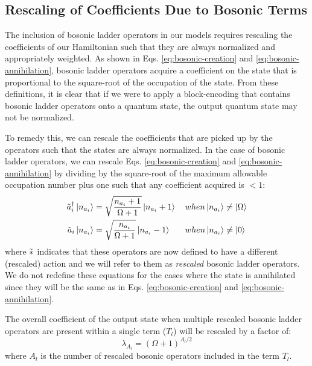 \subsection{Rescaling of Coefficients Due to Bosonic Terms}
\label{subsec:rescaling}

The inclusion of bosonic ladder operators in our models requires rescaling the coefficients of our Hamiltonian such that they are always normalized and appropriately weighted.
As shown in Eqs. \ref{eq:bosonic-creation} and \ref{eq:bosonic-annihilation}, bosonic ladder operators acquire a coefficient on the state that is proportional to the square-root of the occupation of the state.
From these definitions, it is clear that if we were to apply a block-encoding that contains bosonic ladder operators onto a quantum state, the output quantum state may not be normalized.

To remedy this, we can rescale the coefficients that are picked up by the operators such that the states are always normalized.
In the case of bosonic ladder operators, we can rescale Eqs. \ref{eq:bosonic-creation} and \ref{eq:bosonic-annihilation} by dividing by the square-root of the maximum allowable occupation number plus one such that any coefficient acquired is $< 1$:
\begin{equation}
    \label{eq:bosonic-ops-altered}
    \begin{split}
        \Tilde{a}_i^\dagger \ket{n_{a_i}} &= \sqrt{\frac{n_{a_i} + 1}{\Omega + 1}} \ket{n_{a_i} + 1} \hspace{1em} when \ket{n_{a_i}} \neq \ket{\Omega} \\
        \Tilde{a}_i  \ket{n_{a_i}} &= \sqrt{\frac{n_{a_i}}{\Omega + 1}} \ket{n_{a_i} - 1} \hspace{1.7em} when \ket{n_{a_i}} \neq \ket{0}
    \end{split}
\end{equation}
where $\Tilde{*}$ indicates that these operators are now defined to have a different (rescaled) action and we will refer to them as \textit{rescaled} bosonic ladder operators.
We do not redefine these equations for the cases where the state is annihilated since they will be the same as in Eqs.  \ref{eq:bosonic-creation} and \ref{eq:bosonic-annihilation}.

The overall coefficient of the output state when multiple rescaled bosonic ladder operators are present within a single term ($T_l$) will be rescaled by a factor of:
\begin{equation}
    \lambda_{A_l} = (\Omega + 1)^{A_l/2}
\end{equation}
where $A_l$ is the number of rescaled bosonic operators included in the term $T_l$.

